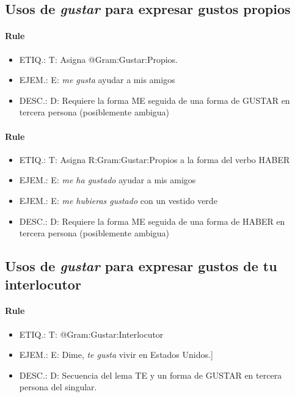 \documentclass[11pt]{report}
\begin{document}
\subsection{Usos de \emph{gustar} para expresar gustos propios}
\paragraph*{Rule}
\begin{itemize}
\item ETIQ.:  T: Asigna @Gram:Gustar:Propios.
\item EJEM.:  E: \emph{me gusta} ayudar a mis amigos 
\item DESC.:  D: Requiere la forma ME seguida de una forma de GUSTAR en tercera persona (posiblemente ambigua)
\end{itemize}

\paragraph*{Rule}
\begin{itemize}
\item ETIQ.:  T: Asigna R:Gram:Gustar:Propios a la forma del verbo HABER
\item EJEM.:  E: \emph{me ha gustado} ayudar a mis amigos 
\item EJEM.:  E: \emph{me hubieras gustado} con un vestido verde 
\item DESC.:  D: Requiere la forma ME seguida de una forma de HABER en tercera persona (posiblemente ambigua)
\end{itemize}

\subsection{Usos de \emph{gustar} para expresar gustos de tu interlocutor}
\paragraph*{Rule}
\begin{itemize}
\item ETIQ.:  T: @Gram:Gustar:Interlocutor
\item EJEM.:  E: Dime, \emph{te gusta} vivir en Estados Unidos.] 
\item DESC.:  D: Secuencia del lema TE y un forma de GUSTAR en tercera persona del singular.
\end{itemize}
\end{document}
